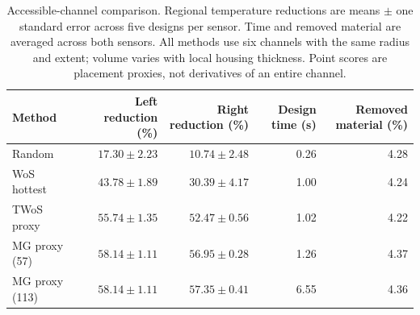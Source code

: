 \begin{table}[t]
\centering\small
\caption{Accessible-channel comparison. Regional temperature reductions are means $\pm$ one standard error across five designs per sensor. Time and removed material are averaged across both sensors. All methods use six channels with the same radius and extent; volume varies with local housing thickness. Point scores are placement proxies, not derivatives of an entire channel.}
\label{tab:accessible}
\begin{tabular}{lrrrr}
\toprule
Method & Left reduction (\%) & Right reduction (\%) & Design time (s) & Removed material (\%) \\
\midrule
Random & $17.30\pm2.23$ & $10.74\pm2.48$ & 0.26 & 4.28 \\
WoS hottest & $43.78\pm1.89$ & $30.39\pm4.17$ & 1.00 & 4.24 \\
TWoS proxy & $55.74\pm1.35$ & $52.47\pm0.56$ & 1.02 & 4.22 \\
MG proxy (57) & $58.14\pm1.11$ & $56.95\pm0.28$ & 1.26 & 4.37 \\
MG proxy (113) & $58.14\pm1.11$ & $57.35\pm0.41$ & 6.55 & 4.36 \\
\bottomrule
\end{tabular}
\end{table}
